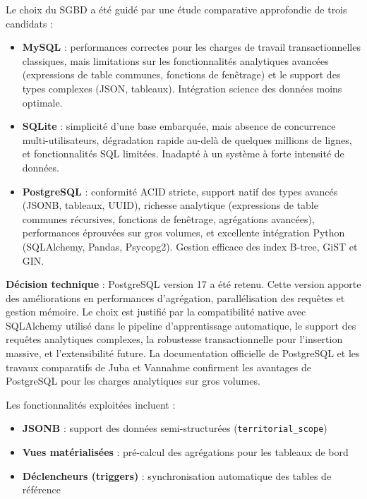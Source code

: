 \documentclass[10pt,twocolumn,a4paper]{article}
\begin{document}
Le choix du SGBD a été guidé par une étude comparative approfondie de trois candidats :

\begin{itemize}
    \item \textbf{MySQL} \cite{mysql} : performances correctes pour les charges de travail transactionnelles classiques, mais limitations sur les fonctionnalités analytiques avancées (expressions de table communes, fonctions de fenêtrage) et le support des types complexes (JSON, tableaux). Intégration science des données moins optimale.
    \item \textbf{SQLite} \cite{sqlite} : simplicité d'une base embarquée, mais absence de concurrence multi-utilisateurs, dégradation rapide au-delà de quelques millions de lignes, et fonctionnalités SQL limitées. Inadapté à un système à forte intensité de données.
    \item \textbf{PostgreSQL} \cite{postgresql} : conformité ACID stricte, support natif des types avancés (JSONB, tableaux, UUID), richesse analytique (expressions de table communes récursives, fonctions de fenêtrage, agrégations avancées), performances éprouvées sur gros volumes, et excellente intégration Python (SQLAlchemy, Pandas, Psycopg2). Gestion efficace des index B-tree, GiST et GIN.
\end{itemize}

\textbf{Décision technique} : PostgreSQL version 17 a été retenu. Cette version apporte des améliorations en performances d'agrégation, parallélisation des requêtes et gestion mémoire. Le choix est justifié par la compatibilité native avec SQLAlchemy utilisé dans le pipeline d'apprentissage automatique, le support des requêtes analytiques complexes, la robustesse transactionnelle pour l'insertion massive, et l'extensibilité future. La documentation officielle de PostgreSQL \cite{postgresql} et les travaux comparatifs de Juba et Vannahme \cite{juba2015} confirment les avantages de PostgreSQL pour les charges analytiques sur gros volumes.

Les fonctionnalités exploitées incluent :
\begin{itemize}
    \item \textbf{JSONB} : support des données semi-structurées (\texttt{territorial\_scope})
    \item \textbf{Vues matérialisées} : pré-calcul des agrégations pour les tableaux de bord
    \item \textbf{Déclencheurs (triggers)} : synchronisation automatique des tables de référence
\end{itemize}
\end{document}
